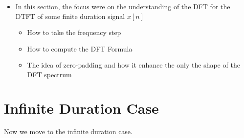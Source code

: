 \begin{itemize}
    \item In this section, the focus were on the understanding of the DFT for the DTFT of some finite duration signal $x[n]$
    
    
    \begin{itemize}
        \item How to take the frequency step
        
        \item How to compute the DFT Formula
        
        \item The idea of zero-padding and how it enhance the only the shape of the DFT spectrum
    \end{itemize}
    
    
\end{itemize}


\section{Infinite Duration Case}
\label{Sec:DFT:Infinite_Duration}
Now we move to the infinite duration case.


